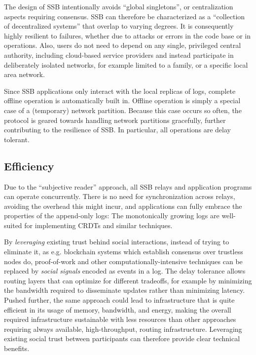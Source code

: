 \documentclass[9pt,sigconf]{acmart}
\begin{document}
The design of SSB intentionally avoids ``global singletons'', or centralization aspects requiring consensus. SSB can therefore be characterized as a ``collection of decentralized systems'' that overlap to varying degrees. It is consequently highly resilient to failures, whether due to attacks or errors in the code base or in operations. Also, users do not need to depend on any single, privileged central authority, including cloud-based service providers and instead participate in deliberately isolated networks, for example limited to a family, or a specific local area network.

Since SSB applications only interact with the local replicas of logs, complete offline operation is automatically built in. Offline operation is simply a special case of a (temporary) network partition. Because this case occurs so often, the protocol is geared towards handling network partitions gracefully, further contributing to the resilience of SSB. In particular, all operations are delay tolerant.




\subsection{Efficiency}

Due to the ``subjective reader'' approach, all SSB relays and application programs can operate concurrently. There is no need for synchronization across relays, avoiding the overhead this might incur, and applications can fully embrace the properties of the append-only logs: The monotonically growing logs are well-suited for implementing CRDTs and similar techniques.

By {\em leveraging} existing trust behind social interactions, instead of trying to eliminate it, as e.g. blockchain systems which establish consensus over trustless nodes do, proof-of-work and other computationally-intensive techniques can be replaced by \textit{social signals} encoded as events in a log. The delay tolerance allows routing layers that can optimize for different tradeoffs, for example by minimizing the bandwidth required to disseminate updates rather than minimizing latency. Pushed further, the same approach could lead to infrastructure that is quite efficient in its usage of memory, bandwidth, and energy, making the overall required infrastructure sustainable with less resources than other approaches requiring always available, high-throughput, routing infrastructure. Leveraging existing social trust between participants can therefore provide clear technical benefits.
\end{document}
